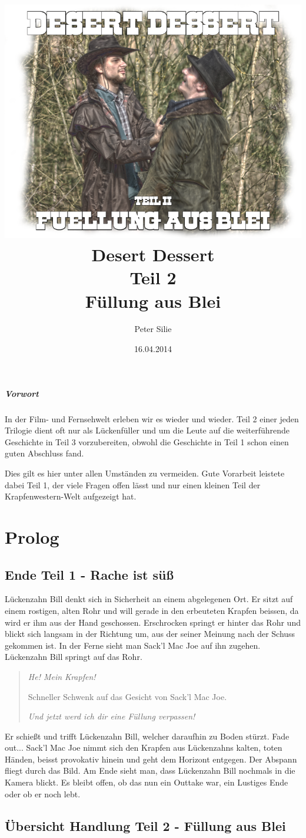 \documentclass[10pt,a4paper,german]{book}
\author{Peter Silie}
\title{	\includegraphics[scale=0.5]{titelbild.png}\\
		\vspace{1cm}
		Desert Dessert\\
		Teil 2\\
		Füllung aus Blei
		}
\date{16.04.2014}
\begin{document}
\maketitle
\tableofcontents
\newpage
\paragraph{Vorwort}
In der Film- und Fernsehwelt erleben wir es wieder und wieder. Teil 2 einer jeden Trilogie dient oft nur als Lückenfüller und um die Leute auf die weiterführende Geschichte in Teil 3 vorzubereiten, obwohl die Geschichte in Teil 1 schon einen guten Abschluss fand.

Dies gilt es hier unter allen Umständen zu vermeiden. Gute Vorarbeit leistete dabei Teil 1, der viele Fragen offen lässt und nur einen kleinen Teil der Krapfenwestern-Welt aufgezeigt hat.
\chapter{Prolog}
\section{Ende Teil 1 - Rache ist süß}
Lückenzahn Bill denkt sich in Sicherheit an einem abgelegenen Ort. Er sitzt auf einem rostigen, alten Rohr und will gerade in den erbeuteten Krapfen beissen, da wird er ihm aus der Hand geschossen. Erschrocken springt er hinter das Rohr und blickt sich langsam in der Richtung um, aus der seiner Meinung nach der Schuss gekommen ist. In der Ferne sieht man Sack'l Mac Joe auf ihn zugehen. Lückenzahn Bill springt auf das Rohr.

\begin{verse}
\textit{\glqq He! Mein Krapfen!\grqq}

Schneller Schwenk auf das Gesicht von Sack'l Mac Joe.

\textit{\glqq Und jetzt werd ich dir eine Füllung verpassen!\grqq}\\
\end{verse}

Er schießt und trifft Lückenzahn Bill, welcher daraufhin zu Boden stürzt. Fade out...
Sack'l Mac Joe nimmt sich den Krapfen aus Lückenzahns kalten, toten Händen, beisst provokativ hinein und geht dem Horizont entgegen.
Der Abspann fliegt durch das Bild.
Am Ende sieht man, dass Lückenzahn Bill nochmals in die Kamera blickt. Es bleibt offen, ob das nun ein Outtake war, ein Lustiges Ende oder ob er noch lebt.

\section{Übersicht Handlung Teil 2 - Füllung aus Blei}
\end{document}
